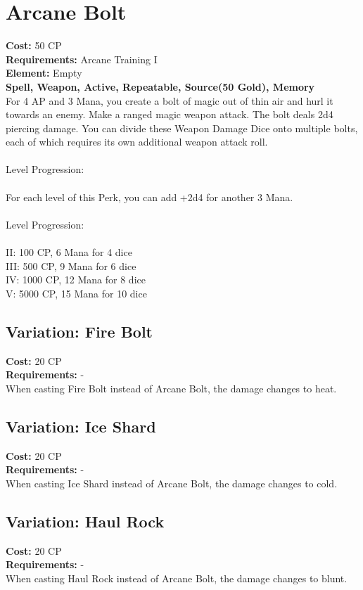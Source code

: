 \section{Arcane Bolt}
\textbf{Cost:} 50 CP\\
\textbf{Requirements:}  Arcane Training I\\
\textbf{Element:} Empty\\
\textbf{Spell, Weapon, Active, Repeatable, Source(50 Gold), Memory}\\
For 4 AP and 3 Mana, you create a bolt of magic out of thin air and hurl it towards an enemy. Make a ranged magic weapon attack. The bolt deals 2d4 piercing damage. You can divide these Weapon Damage Dice onto multiple bolts, each of which requires its own additional weapon attack roll.\\
\\
Level Progression:\\
\\
For each level of this Perk, you can add +2d4 for another 3 Mana. \\
\\
Level Progression:\\
\\
II: 100 CP, 6 Mana for 4 dice\\
III: 500 CP, 9 Mana for 6 dice\\
IV: 1000 CP, 12 Mana for 8 dice\\
V: 5000 CP, 15 Mana for 10 dice\\

\subsection{Variation: Fire Bolt}
\textbf{Cost:} 20 CP\\
\textbf{Requirements:} -\\
When casting Fire Bolt instead of Arcane Bolt, the damage changes to heat.\\

\subsection{Variation: Ice Shard}
\textbf{Cost:} 20 CP\\
\textbf{Requirements:} -\\
When casting Ice Shard instead of Arcane Bolt, the damage changes to cold.\\

\subsection{Variation: Haul Rock}
\textbf{Cost:} 20 CP\\
\textbf{Requirements:} -\\
When casting Haul Rock instead of Arcane Bolt, the damage changes to blunt.\\

